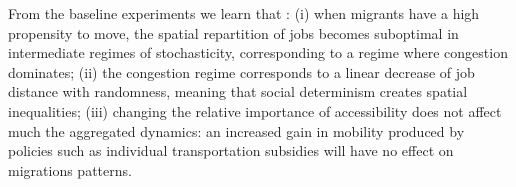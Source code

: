 From the baseline experiments we learn that : (i) when migrants have a high propensity to move, the spatial repartition of jobs becomes suboptimal in intermediate regimes of stochasticity, corresponding to a regime where congestion dominates; %
 (ii) the congestion regime corresponds to a linear decrease of job distance with randomness, meaning that social determinism creates spatial inequalities; %
 (iii) changing the relative importance of accessibility does not affect much the aggregated dynamics: an increased gain in mobility produced by policies such as individual transportation subsidies will have no effect on migrations patterns. %

